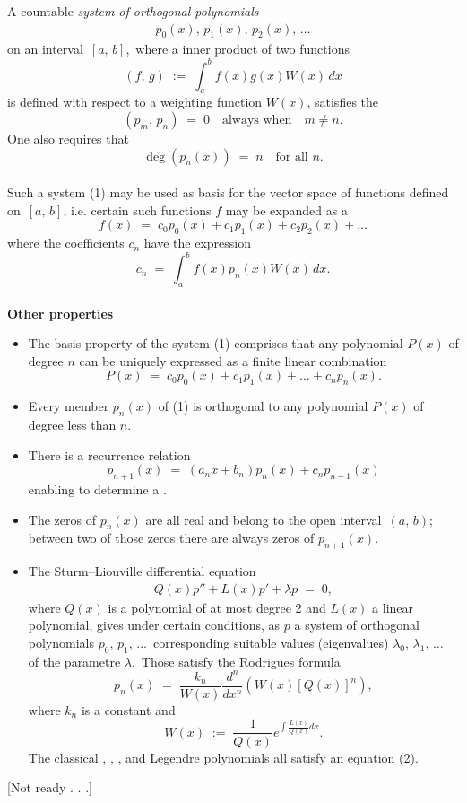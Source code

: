 \documentclass[12pt]{article}
\theoremstyle{definition}
\begin{document}
A countable \emph{system of orthogonal polynomials}
\begin{align}
p_0(x),\,p_1(x),\,p_2(x),\,\ldots
\end{align}
on an interval \,$[a,\,b]$,\, where a inner product of two functions 
$$(f,\,g) \;:=\; \int_a^b\!f(x)g(x)W(x)\,dx$$
is defined with respect to a weighting function $W(x)$, satisfies the 
$$(p_m,\,p_n) \;=\; 0 \quad \mbox{always when}\quad m \neq n.$$
One also requires that
$$\deg\left(p_n(x)\right) \;=\; n \quad \mbox{for all } n.$$\\


Such a system (1) may be used as basis for the vector space of functions defined on\, $[a,\,b]$, i.e. certain such functions $f$ may be expanded as a 
$$f(x) \;=\; c_0p_0(x)+c_1p_1(x)+c_2p_2(x)+\ldots$$
where the coefficients $c_n$ have the expression
$$c_n \;=\; \int_a^b\!f(x)p_n(x)W(x)\,dx.$$\\

\textbf{Other properties}

\begin{itemize}

\item The basis property of the system (1) comprises that any polynomial $P(x)$ of degree $n$ can be uniquely expressed as a finite linear combination$\!$
$$P(x) \;=\; c_0p_0(x)+c_1p_1(x)+\ldots+c_np_n(x).$$

\item Every member $p_n(x)$ of (1) is orthogonal to any polynomial $P(x)$ of degree less than $n$.

\item There is a recurrence relation
$$p_{n+1}(x) \;=\; (a_nx\!+\!b_n)p_n(x)+c_np_{n-1}(x)$$
enabling to determine a .

\item The zeros of $p_n(x)$ are all real and belong to the open interval \,$(a,\,b)$;\, between two of those zeros there are always zeros of $p_{n+1}(x)$.

\item The Sturm--Liouville differential equation
\begin{align}
Q(x)p''+L(x)p'+\lambda p \;=\; 0,
\end{align}
where $Q(x)$ is a polynomial of at most degree 2 and $L(x)$ a linear polynomial, gives under certain conditions, as  $p$ a system of orthogonal polynomials $p_0,\,p_1,\,\ldots$\, corresponding suitable values (eigenvalues) $\lambda_0,\,\lambda_1,\,\ldots$\, of the parametre $\lambda$.\, Those  satisfy the Rodrigues formula
$$p_n(x) \;=\; \frac{k_n}{W(x)}\frac{d^n}{dx^n}\left(W(x)[Q(x)]^n\right),$$
where $k_n$ is a constant and
$$W(x) \;:=\; \frac{1}{Q(x)}e^{\int\frac{L(x)}{Q(x)}dx}.$$
The classical , , , and Legendre polynomials all satisfy an equation (2).

\end{itemize}

[Not ready . . .]
\end{document}
